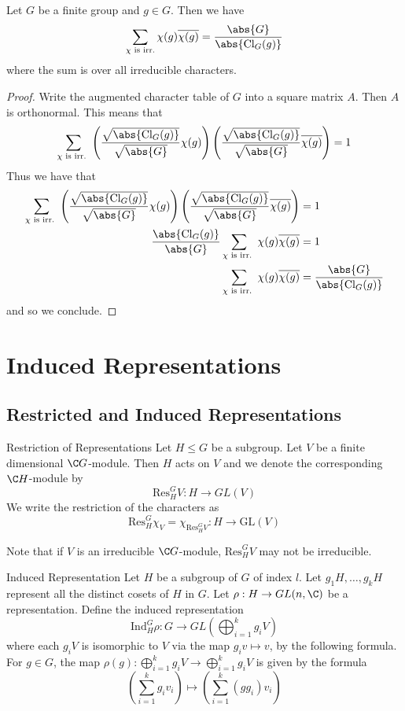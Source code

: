 \documentclass[a4paper]{article}
\begin{document}
\begin{crl}{}{} Let $G$ be a finite group and $g\in G$. Then we have $$\sum_{\chi\text{ is irr.}}\chi(g)\overline{\chi(g)}=\frac{\abs{G}}{\abs{\text{Cl}_G(g)}}$$ where the sum is over all irreducible characters. \tcbline
\begin{proof}
Write the augmented character table of $G$ into a square matrix $A$. Then $A$ is orthonormal. This means that $$\sum_{\chi\text{ is irr. }}\left(\frac{\sqrt{\abs{\text{Cl}_G(g)}}}{\sqrt{\abs{G}}}\chi(g)\right)\left(\frac{\sqrt{\abs{\text{Cl}_G(g)}}}{\sqrt{\abs{G}}}\overline{\chi(g)}\right)=1$$ Thus we have that 
\begin{align*}
\sum_{\chi\text{ is irr. }}\left(\frac{\sqrt{\abs{\text{Cl}_G(g)}}}{\sqrt{\abs{G}}}\chi(g)\right)\left(\frac{\sqrt{\abs{\text{Cl}_G(g)}}}{\sqrt{\abs{G}}}\overline{\chi(g)}\right)&=1\\
\frac{\abs{\text{Cl}_G(g)}}{\abs{G}}\sum_{\chi\text{ is irr. }}\chi(g)\overline{\chi(g)}&=1\\
\sum_{\chi\text{ is irr. }}\chi(g)\overline{\chi(g)}&=\frac{\abs{G}}{\abs{\text{Cl}_G(g)}}
\end{align*}
and so we conclude. 
\end{proof}
\end{crl}

\pagebreak
\section{Induced Representations}
\subsection{Restricted and Induced Representations}
\begin{defn}{Restriction of Representations}{} Let $H\leq G$ be a subgroup. Let $V$ be a finite dimensional $\C G$-module. Then $H$ acts on $V$ and we denote the corresponding $\C H$-module by $$\text{Res}_H^GV:H\to GL(V)$$ We write the restriction of the characters as $$\text{Res}_H^G\chi_V=\chi_{\text{Res}_H^GV}:H\to\text{GL}(V)$$
\end{defn}

Note that if $V$ is an irreducible $\C G$-module, $\text{Res}_H^GV$ may not be irreducible. 

\begin{defn}{Induced Representation}{} Let $H$ be a subgroup of $G$ of index $l$. Let $g_1H,\dots,g_kH$ represent all the distinct cosets of $H$ in $G$. Let $\rho:H\to GL(n,\C)$ be a representation. Define the induced representation $$\text{Ind}_H^G\rho:G\to GL\left(\bigoplus_{i=1}^kg_iV\right)$$ where each $g_i V$ is isomorphic to $V$ via the map $g_iv\mapsto v$, by the following formula. For $g\in G$, the map $\rho(g):\bigoplus_{i=1}^kg_iV\to\bigoplus_{i=1}^kg_iV$ is given by the formula $$\left(\sum_{i=1}^kg_iv_i\right)\mapsto\left(\sum_{i=1}^k(gg_i)v_i\right)$$
\end{defn}
\end{document}

